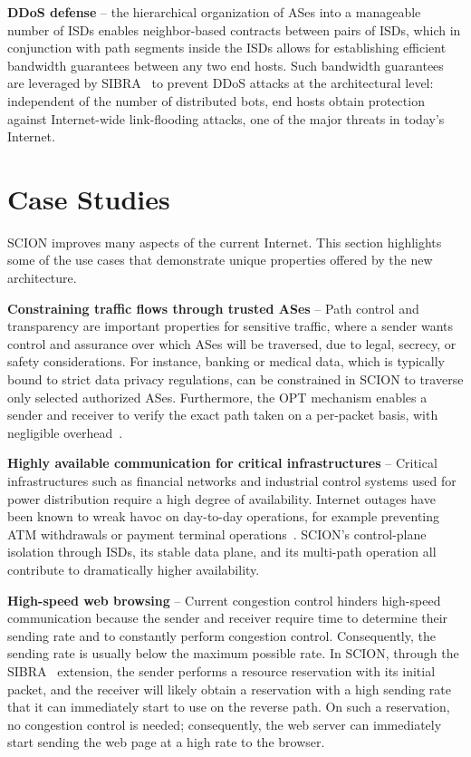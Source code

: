 \documentclass[a4paper]{llncs}
\newcommand\SCION{{\small\textsf{SCION}}\xspace}
\begin{document}
\textbf{DDoS defense} -- the hierarchical organization of ASes into a
manageable number of ISDs enables neighbor-based contracts between pairs of
ISDs, which in conjunction with path segments inside the ISDs allows for
establishing efficient bandwidth guarantees between any two end hosts. Such
bandwidth guarantees are leveraged by SIBRA~\cite{BRSPZHKU2015} to prevent DDoS
attacks at the architectural level: independent of the number of distributed
bots, end hosts obtain protection against Internet-wide link-flooding attacks,
one of the major threats in today's Internet.

\section{Case Studies}

\SCION improves many aspects of the current Internet. This section highlights some of the
use cases that demonstrate unique properties offered by the new architecture.


\textbf{Constraining traffic flows through trusted ASes} --
Path control and transparency are important properties for sensitive traffic,
where a sender wants control and assurance over which ASes will be traversed, 
due to legal, secrecy, or safety considerations. For instance, banking or 
medical data, which is typically bound to strict data privacy regulations, can 
be constrained in \SCION to traverse only selected authorized ASes. Furthermore, 
the OPT mechanism enables a sender and receiver to verify the exact path taken 
on a per-packet basis, with negligible overhead~\cite{KBJLHP2014}.

\textbf{Highly available communication for critical infrastructures} --
Critical infrastructures such as financial networks and industrial control 
systems used for power distribution require a 
high degree of
availability. Internet outages have been known to wreak havoc on 
day-to-day operations, for example preventing ATM withdrawals or payment 
terminal operations~\cite{malaysialeak-bgpmon}. \SCION{}'s control-plane 
isolation through ISDs, its stable data plane, and its multi-path operation all 
contribute to dramatically higher availability.

\textbf{High-speed web browsing} -- 
Current congestion control hinders high-speed communication because the sender
and receiver require time to determine their sending rate and to constantly
perform congestion control.  Consequently, the sending rate is usually below
the maximum possible rate. In \SCION, through the SIBRA~\cite{BRSPZHKU2015}
extension, the sender performs a resource reservation with its initial packet,
and the receiver will likely obtain a reservation with a high sending rate that
it can immediately start to use on the reverse path. On such a reservation, no
congestion control is needed; consequently, the web server can immediately
start sending the web page at a high rate to the browser.
\end{document}
